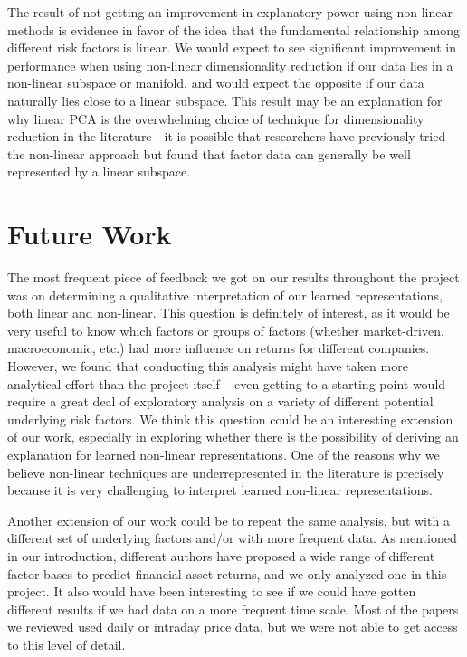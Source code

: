 \documentclass[a4paper]{article}
\begin{document}
    \par The result of not getting an improvement in explanatory power using non-linear methods is evidence in favor of the idea that the fundamental relationship among different risk factors is linear. We would expect to see significant improvement in performance when using non-linear dimensionality reduction if our data lies in a non-linear subspace or manifold, and would expect the opposite if our data naturally lies close to a linear subspace. This result may be an explanation for why linear PCA is the overwhelming choice of technique for dimensionality reduction in the literature - it is possible that researchers have previously tried the non-linear approach but found that factor data can generally be well represented by a linear subspace.
    
    \section{Future Work}
    \par The most frequent piece of feedback we got on our results throughout the project was on determining a qualitative interpretation of our learned representations, both linear and non-linear. This question is definitely of interest, as it would be very useful to know which factors or groups of factors (whether market-driven, macroeconomic, etc.) had more influence on returns for different companies. However, we found that conducting this analysis might have taken more analytical effort than the project itself – even getting to a starting point would require a great deal of exploratory analysis on a variety of different potential underlying risk factors. We think this question could be an interesting extension of our work, especially in exploring whether there is the possibility of deriving an explanation for learned non-linear representations. One of the reasons why we believe non-linear techniques are underrepresented in the literature is precisely because it is very challenging to interpret learned non-linear representations.
    \par Another extension of our work could be to repeat the same analysis, but with a different set of underlying factors and/or with more frequent data. As mentioned in our introduction, different authors have proposed a wide range of different factor bases to predict financial asset returns, and we only analyzed one in this project. It also would have been interesting to see if we could have gotten different results if we had data on a more frequent time scale. Most of the papers we reviewed used daily or intraday price data, but we were not able to get access to this level of detail.
    
\end{document}
